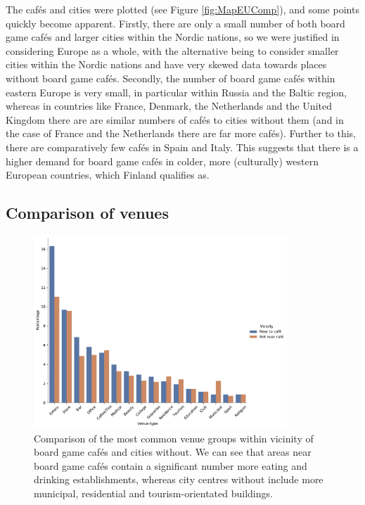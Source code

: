 \documentclass{article}
\begin{document}
    The caf\'es and cities were plotted (see Figure \ref{fig:MapEUComp}), and some points quickly become apparent.
    Firstly, there are only a small number of both board game caf\'es and larger cities within the Nordic nations, so we were justified in considering Europe as a whole, with the alternative being to consider smaller cities within the Nordic nations and have very skewed data towards places without board game caf\'es.
    Secondly, the number of board game caf\'es within eastern Europe is very small, in particular within Russia and the Baltic region, whereas in countries like France, Denmark, the Netherlands and the United Kingdom there are are similar numbers of caf\'es to cities without them (and in the case of France and the Netherlands there are far more caf\'es).
    Further to this, there are comparatively few caf\'es in Spain and Italy.
    This suggests that there is a higher demand for board game caf\'es in colder, more (culturally) western European countries, which Finland qualifies as.

    \subsection{Comparison of venues}

    \begin{figure}[t]
        \centering
        \includegraphics[width=0.85\textwidth]{avg_venues.pdf}
        \caption{\label{fig:AvgVenues}Comparison of the most common venue groups within vicinity of board game caf\'es and cities without. 
        We can see that areas near board game caf\'es contain a significant number more eating and drinking establishments, whereas city centres without include more municipal, residential and tourism-orientated buildings.}
    \end{figure}
\end{document}
